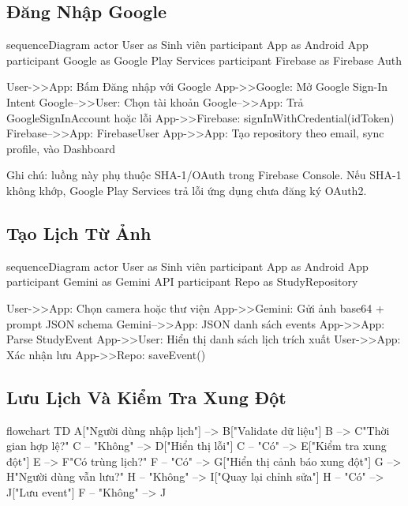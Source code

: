 \documentclass[12pt,a4paper]{report}
\begin{document}
\subsection{Đăng Nhập Google}

\begin{CodeBlock}
sequenceDiagram
    actor User as Sinh viên
    participant App as Android App
    participant Google as Google Play Services
    participant Firebase as Firebase Auth

    User->>App: Bấm Đăng nhập với Google
    App->>Google: Mở Google Sign-In Intent
    Google-->>User: Chọn tài khoản
    Google-->>App: Trả GoogleSignInAccount hoặc lỗi
    App->>Firebase: signInWithCredential(idToken)
    Firebase-->>App: FirebaseUser
    App->>App: Tạo repository theo email, sync profile, vào Dashboard
\end{CodeBlock}

Ghi chú: luồng này phụ thuộc SHA-1/OAuth trong Firebase Console. Nếu SHA-1 không khớp, Google Play Services trả lỗi ứng dụng chưa đăng ký OAuth2.

\subsection{Tạo Lịch Từ Ảnh}

\begin{CodeBlock}
sequenceDiagram
    actor User as Sinh viên
    participant App as Android App
    participant Gemini as Gemini API
    participant Repo as StudyRepository

    User->>App: Chọn camera hoặc thư viện
    App->>Gemini: Gửi ảnh base64 + prompt JSON schema
    Gemini-->>App: JSON danh sách events
    App->>App: Parse StudyEvent
    App->>User: Hiển thị danh sách lịch trích xuất
    User->>App: Xác nhận lưu
    App->>Repo: saveEvent()
\end{CodeBlock}

\subsection{Lưu Lịch Và Kiểm Tra Xung Đột}

\begin{CodeBlock}
flowchart TD
    A["Người dùng nhập lịch"] --> B["Validate dữ liệu"]
    B --> C{"Thời gian hợp lệ?"}
    C -- "Không" --> D["Hiển thị lỗi"]
    C -- "Có" --> E["Kiểm tra xung đột"]
    E --> F{"Có trùng lịch?"}
    F -- "Có" --> G["Hiển thị cảnh báo xung đột"]
    G --> H{"Người dùng vẫn lưu?"}
    H -- "Không" --> I["Quay lại chỉnh sửa"]
    H -- "Có" --> J["Lưu event"]
    F -- "Không" --> J
\end{CodeBlock}
\end{document}
